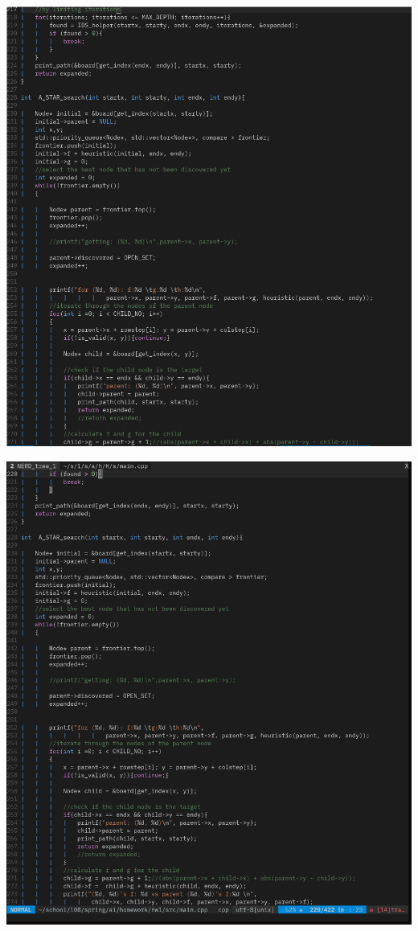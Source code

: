 \documentclass{article}
\begin{document}
\includegraphics[scale=0.5]{sc5.png}

\includegraphics[scale=0.5]{sc6.png}
\end{document}
